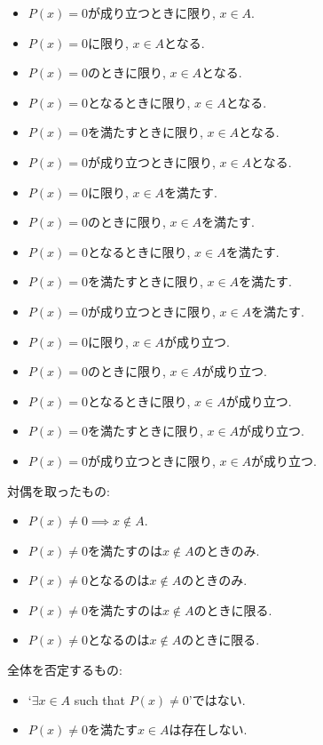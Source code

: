 \documentclass[a4paper,12pt,draft]{amsart}
\newcommand{\PPP}[1]{P(#1)=0}
\newcommand{\NotPPP}[1]{P(#1)\neq 0}
\begin{document}
\begin{itemize}
\item $\PPP{x}$が成り立つときに限り, $x\in A$.
\item $\PPP{x}$に限り, $x\in A$となる.
\item $\PPP{x}$のときに限り, $x\in A$となる.
\item $\PPP{x}$となるときに限り, $x\in A$となる.
\item $\PPP{x}$を満たすときに限り, $x\in A$となる.
\item $\PPP{x}$が成り立つときに限り, $x\in A$となる.
\item $\PPP{x}$に限り, $x\in A$を満たす.
\item $\PPP{x}$のときに限り, $x\in A$を満たす.
\item $\PPP{x}$となるときに限り, $x\in A$を満たす.
\item $\PPP{x}$を満たすときに限り, $x\in A$を満たす.
\item $\PPP{x}$が成り立つときに限り, $x\in A$を満たす.
\item $\PPP{x}$に限り, $x\in A$が成り立つ.
\item $\PPP{x}$のときに限り, $x\in A$が成り立つ.
\item $\PPP{x}$となるときに限り, $x\in A$が成り立つ.
\item $\PPP{x}$を満たすときに限り, $x\in A$が成り立つ.
\item $\PPP{x}$が成り立つときに限り, $x\in A$が成り立つ.
\end{itemize}
対偶を取ったもの:
\begin{itemize}
\item $\NotPPP{x}\implies x\not\in A$.
\item $\NotPPP{x}$を満たすのは$x\not\in A$のときのみ.
\item $\NotPPP{x}$となるのは$x\not\in A$のときのみ.
\item $\NotPPP{x}$を満たすのは$x\not\in A$のときに限る.
\item $\NotPPP{x}$となるのは$x\not\in A$のときに限る.
\end{itemize}
全体を否定するもの:
\begin{itemize}
\item `$\exists x\in A$ such that $\NotPPP{x}$'ではない.
\item $\NotPPP{x}$を満たす$x\in A$は存在しない.
\end{itemize}
\end{document}
